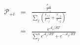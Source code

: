 \begin{eqnarray}\
{\mathcal P}_{+i}  & = & \frac{\frac{r_{+i}}{r_{-i}}}{\sum_j\left(\frac{r_{+j}}{r_{-j}} + \frac{r_{-j}}{r_{+j}}  \right)} \\
& = & \frac{e^{\mathcal A_i/RT}}{\sum_j^n e^{\mathcal A_j/RT} + e^{-\mathcal A_j/RT}} \\
\end{eqnarray}